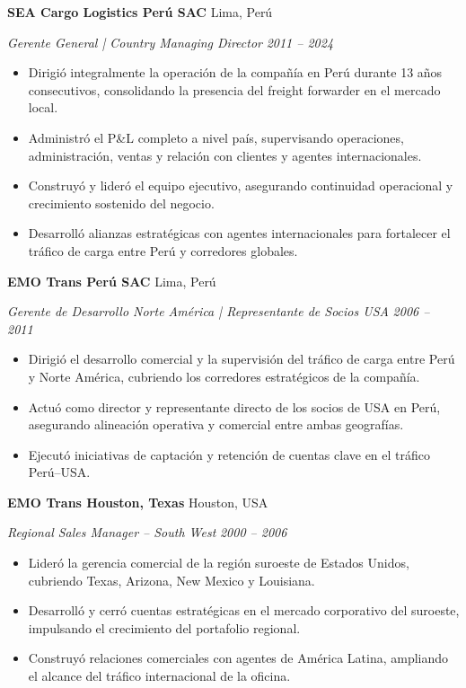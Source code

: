 \documentclass[11pt,letterpaper]{article}
\newcommand{\entry}[4]{%
  \noindent\textbf{#1} \hfill #2 \par\nopagebreak
  \textit{#3} \hfill \textit{#4} \par\nopagebreak
}
\begin{document}
\entry{SEA Cargo Logistics Perú SAC}{Lima, Perú}{Gerente General | Country Managing Director}{2011 -- 2024}
\begin{itemize}
  \item Dirigió integralmente la operación de la compañía en Perú durante 13 años consecutivos, consolidando la presencia del freight forwarder en el mercado local.
  \item Administró el P\&L completo a nivel país, supervisando operaciones, administración, ventas y relación con clientes y agentes internacionales.
  \item Construyó y lideró el equipo ejecutivo, asegurando continuidad operacional y crecimiento sostenido del negocio.
  \item Desarrolló alianzas estratégicas con agentes internacionales para fortalecer el tráfico de carga entre Perú y corredores globales.
\end{itemize}
\vspace{0.3em}

\entry{EMO Trans Perú SAC}{Lima, Perú}{Gerente de Desarrollo Norte América | Representante de Socios USA}{2006 -- 2011}
\begin{itemize}
  \item Dirigió el desarrollo comercial y la supervisión del tráfico de carga entre Perú y Norte América, cubriendo los corredores estratégicos de la compañía.
  \item Actuó como director y representante directo de los socios de USA en Perú, asegurando alineación operativa y comercial entre ambas geografías.
  \item Ejecutó iniciativas de captación y retención de cuentas clave en el tráfico Perú--USA.
\end{itemize}
\vspace{0.3em}

\entry{EMO Trans Houston, Texas}{Houston, USA}{Regional Sales Manager -- South West}{2000 -- 2006}
\begin{itemize}
  \item Lideró la gerencia comercial de la región suroeste de Estados Unidos, cubriendo Texas, Arizona, New Mexico y Louisiana.
  \item Desarrolló y cerró cuentas estratégicas en el mercado corporativo del suroeste, impulsando el crecimiento del portafolio regional.
  \item Construyó relaciones comerciales con agentes de América Latina, ampliando el alcance del tráfico internacional de la oficina.
\end{itemize}
\vspace{0.3em}
\end{document}
